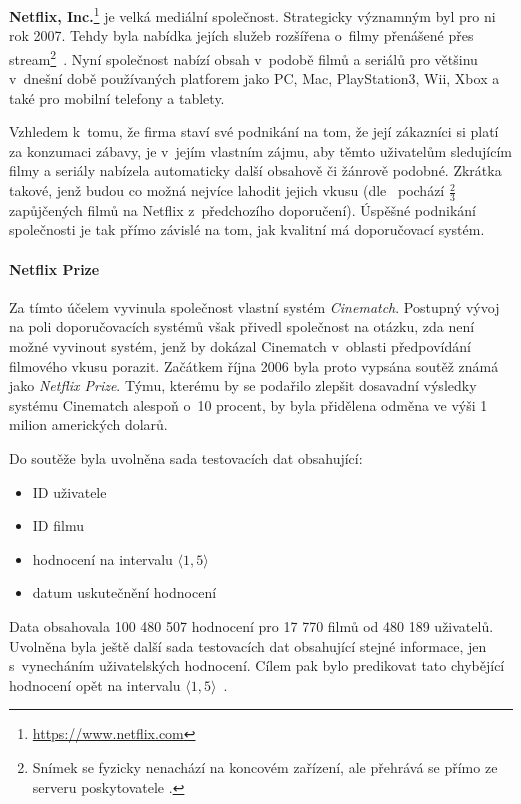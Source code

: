 \documentclass[thesis=M,czech]{FITthesis}[2014/05/07]
\begin{document}
\textbf{Netflix, Inc.}\footnote{\url{https://www.netflix.com}} je velká mediální společnost. Strategicky významným byl pro ni rok 2007. Tehdy byla nabídka jejích služeb rozšířena o~filmy přenášené přes stream\footnote{Snímek se fyzicky nenachází na koncovém zařízení, ale přehrává se přímo ze serveru poskytovatele .}~\cite{netflix2007}. Nyní společnost nabízí obsah v~podobě filmů a seriálů pro většinu v~dnešní době používaných platforem jako PC, Mac, PlayStation3, Wii, Xbox a také pro mobilní telefony a tablety. 

Vzhledem k~tomu, že firma staví své podnikání na tom, že její zákazníci si platí za konzumaci zábavy, je v~jejím vlastním zájmu, aby těmto uživatelům sledujícím filmy a seriály nabízela automaticky další obsahově či žánrově podobné. Zkrátka takové, jenž budou co možná nejvíce lahodit jejich vkusu (dle~\cite{netflixrec} pochází $\frac{2}{3}$ zapůjčených filmů na Netflix z~předchozího doporučení). Úspěšné podnikání společnosti je tak přímo závislé na tom, jak kvalitní má doporučovací systém.

\paragraph{Netflix Prize}
Za tímto účelem vyvinula společnost vlastní systém \emph{Cinematch}. Postupný vývoj na poli doporučovacích systémů však přivedl společnost na otázku, zda není možné vyvinout systém, jenž by dokázal Cinematch v~oblasti předpovídání filmového vkusu porazit. Začátkem října 2006 byla proto vypsána soutěž známá jako \emph{Netflix Prize}. Týmu, kterému by se podařilo zlepšit dosavadní výsledky systému Cinematch alespoň o~10 procent, by byla přidělena odměna ve výši 1 milion amerických dolarů.

Do soutěže byla uvolněna sada testovacích dat obsahující:

\begin{itemize}
	\item ID uživatele
	\item ID filmu
	\item hodnocení na intervalu $\langle1,5\rangle$
	\item datum uskutečnění hodnocení
\end{itemize}

Data obsahovala 100 480 507 hodnocení pro 17 770 filmů od 480 189 uživatelů. Uvolněna byla ještě další sada testovacích dat obsahující stejné informace, jen s~vynecháním uživatelských hodnocení. Cílem pak bylo predikovat tato chybějící hodnocení opět na intervalu $\langle1,5\rangle$~\cite{netflixrules}.
\end{document}
